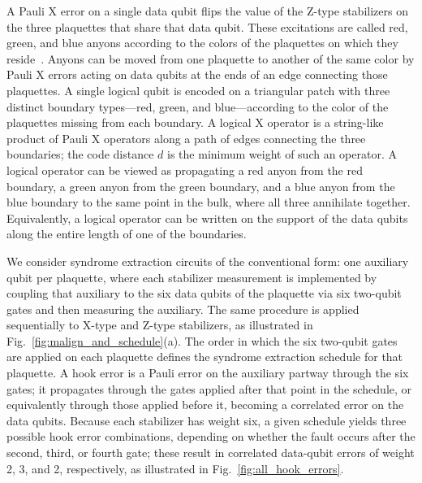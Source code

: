 \documentclass[twocolumn,
aps,
prx,
showpacs,
amsmath,
amssymb,
floatfix,
longbibliography,
superscriptaddress,
eprint]
{revtex4-1}
\begin{document}
A Pauli X error on a single data qubit flips the value of the Z-type stabilizers on the three plaquettes that share that data qubit.
These excitations are called red, green, and blue anyons according to the colors of the plaquettes on which they reside~\cite{Kesselring_2024}.
Anyons can be moved from one plaquette to another of the same color by Pauli X errors acting on data qubits at the ends of an edge connecting those plaquettes.
A single logical qubit is encoded on a triangular patch with three distinct boundary types—red, green, and blue—according to the color of the plaquettes missing from each boundary.
A logical X operator is a string-like product of Pauli X operators along a path of edges connecting the three boundaries; the code distance $d$ is the minimum weight of such an operator.
A logical operator can be viewed as propagating a red anyon from the red boundary, a green anyon from the green boundary, and a blue anyon from the blue boundary to the same point in the bulk, where all three annihilate together.
Equivalently, a logical operator can be written on the support of the data qubits along the entire length of one of the boundaries.

We consider syndrome extraction circuits of the conventional form: one auxiliary qubit per plaquette, where each stabilizer measurement is implemented by coupling that auxiliary to the six data qubits of the plaquette via six two-qubit gates and then measuring the auxiliary.
The same procedure is applied sequentially to X-type and Z-type stabilizers, as illustrated in Fig.~\ref{fig:malign_and_schedule}(a).
The order in which the six two-qubit gates are applied on each plaquette defines the syndrome extraction schedule for that plaquette.
A hook error is a Pauli error on the auxiliary partway through the six gates; it propagates through the gates applied after that point in the schedule, or equivalently through those applied before it, becoming a correlated error on the data qubits.
Because each stabilizer has weight six, a given schedule yields three possible hook error combinations, depending on whether the fault occurs after the second, third, or fourth gate; these result in correlated data-qubit errors of weight 2, 3, and 2, respectively, as illustrated in Fig.~\ref{fig:all_hook_errors}.
\end{document}
